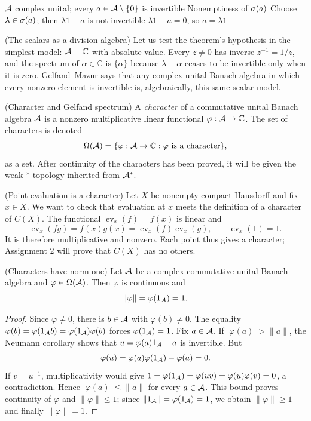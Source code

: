 \proofdiagram
{$\mathcal A$ complex unital; every $a\in\mathcal A\setminus\{0\}$ is invertible}
{Nonemptiness of $\sigma(a)$}
{Choose $\lambda\in\sigma(a)$; then $\lambda1-a$ is not invertible}
{$\lambda1-a=0$, so $a=\lambda1$}

\begin{cthejemplo}{(The scalars as a division algebra)}
Let us test the theorem's hypothesis in the simplest model:
$\mathcal A=\mathbb C$ with absolute value. Every $z\ne0$ has inverse
$z^{-1}=1/z$, and the spectrum of $\alpha\in\mathbb C$ is
$\{\alpha\}$ because $\lambda-\alpha$ ceases to be invertible only
when it is zero. Gelfand--Mazur says that any complex unital
Banach algebra in which every nonzero element is invertible
is, algebraically, this same scalar model.
\end{cthejemplo}

\begin{cthdefinicion}{(Character and Gelfand spectrum)}
A \emph{character} of a commutative unital Banach algebra $\mathcal A$ is a nonzero
multiplicative linear functional $\varphi:\mathcal A\to\mathbb C$. The set of characters is denoted
\[
 \Omega(\mathcal A)=\{\varphi:\mathcal A\to\mathbb C:\varphi\text{ is a character}\},
\]
as a set. After continuity of the characters has been proved, it will be given
the weak-$*$ topology inherited from $\mathcal A^*$.
\end{cthdefinicion}

\begin{cthejemplo}{(Point evaluation is a character)}
Let $X$ be nonempty compact Hausdorff and fix $x\in X$.
We want to check that evaluation at $x$ meets the definition of a character
of $C(X)$. The functional $\operatorname{ev}_x(f)=f(x)$ is linear and
\[
 \operatorname{ev}_x(fg)=f(x)g(x)
 =\operatorname{ev}_x(f)\operatorname{ev}_x(g),\qquad
 \operatorname{ev}_x(1)=1.
\]
It is therefore multiplicative and nonzero. Each point thus gives a
character; Assignment 2 will prove that $C(X)$ has no others.
\end{cthejemplo}

\begin{cthproposicion}{(Characters have norm one)}
Let $\mathcal A$ be a complex commutative unital Banach algebra and
$\varphi\in\Omega(\mathcal A)$. Then $\varphi$ is continuous and
\[
 \|\varphi\|=\varphi(1_\mathcal A)=1.
\]
\end{cthproposicion}

\begin{proof}[Proof]
Since $\varphi\ne0$, there is $b\in\mathcal A$ with $\varphi(b)\ne0$.
The equality $\varphi(b)=\varphi(1_\mathcal A b)=\varphi(1_\mathcal A)\varphi(b)$
forces $\varphi(1_\mathcal A)=1$. Fix $a\in\mathcal A$.
If $|\varphi(a)|>\|a\|$, the Neumann corollary shows that
$u=\varphi(a)1_\mathcal A-a$ is invertible. But
\[
 \varphi(u)=\varphi(a)\varphi(1_\mathcal A)-\varphi(a)=0.
\]
If $v=u^{-1}$, multiplicativity would give
$1=\varphi(1_\mathcal A)=\varphi(uv)=\varphi(u)\varphi(v)=0$,
a contradiction. Hence $|\varphi(a)|\le\|a\|$ for every
$a\in\mathcal A$. This bound proves continuity of $\varphi$ and
$\|\varphi\|\le1$; since $\|1_\mathcal A\|=\varphi(1_\mathcal A)=1$,
we obtain $\|\varphi\|\ge1$ and finally $\|\varphi\|=1$.
\end{proof}

